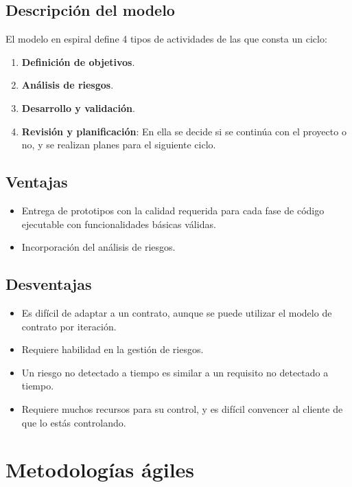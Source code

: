 \subsection{Descripción del modelo}
El modelo en espiral define 4 tipos de actividades de las que consta un ciclo:
\begin{enumerate}
   \item \textbf{Definición de objetivos}.
   \item \textbf{Análisis de riesgos}.
   \item \textbf{Desarrollo y validación}.
   \item \textbf{Revisión y planificación}: En ella se decide si se continúa con el proyecto o no, y se realizan planes para el siguiente ciclo.
\end{enumerate}



\subsection{Ventajas}%
\begin{itemize}
   \item Entrega de prototipos con la calidad requerida para cada fase de código ejecutable con funcionalidades básicas válidas.
   \item Incorporación del análisis de riesgos.
\end{itemize}

\subsection{Desventajas}
\begin{itemize}
   \item Es difícil de adaptar a un contrato, aunque se puede utilizar el modelo de contrato por iteración.
   \item Requiere habilidad en la gestión de riesgos.
   \item Un riesgo no detectado a tiempo es similar a un requisito no detectado a tiempo. %
   \item Requiere muchos recursos para su control, y es difícil convencer al cliente de que lo estás controlando.
\end{itemize}

\section{Metodologías ágiles}

